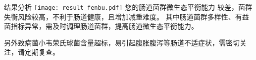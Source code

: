 \vspace*{3mm}

\begin{spacing}{1.5}

\begin{LRaside}[.8]{\fontsize{8.8pt}{11pt}\selectfont 结果分析}
\noindent
\texttt{[image: result\_fenbu.pdf]}
\asidebreak %
\fontsize{8pt}{11pt}\selectfont
您的肠道菌群微生态平衡能力
较差，菌群失衡风险较高，不利于肠道健康，且增加减重难度。
其中肠道菌群多样性、有益菌指标异常，需及时调理肠道菌群，提高肠道微生态平衡能力。


\noindent 另外致病菌小韦荣氏球菌含量超标，易引起腹胀腹泻等肠道不适症状，需密切关注，请定期复查。

\end{LRaside}

\end{spacing}



